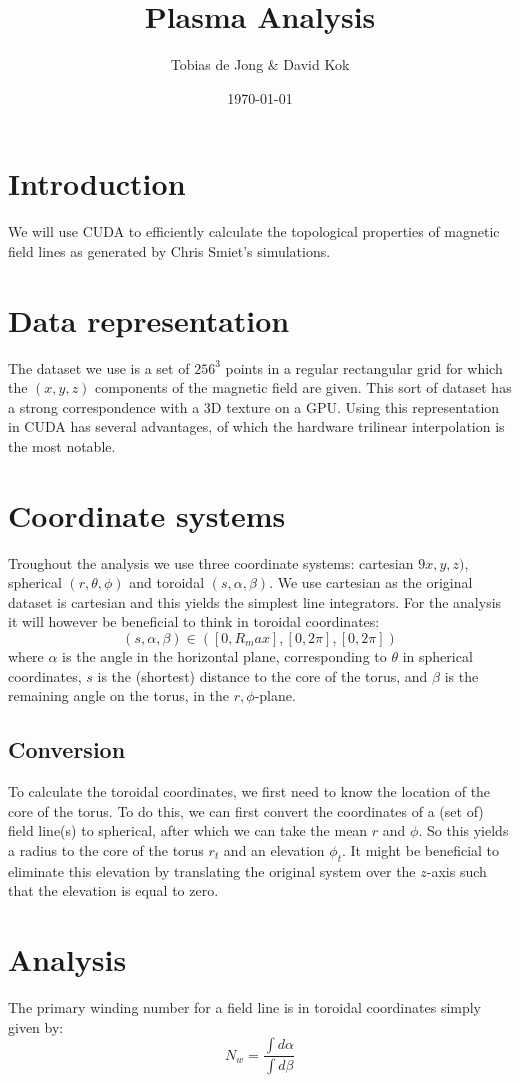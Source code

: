 \documentclass{article}
\begin{document}
\title{Plasma Analysis}
\author{Tobias de Jong \& David Kok}
\date{\today}
\maketitle
\section{Introduction}
We will use CUDA to efficiently calculate the topological properties of magnetic field lines as generated by Chris Smiet's simulations.\cite{PhysRevLett.115.095001}
\section{Data representation}
The dataset we use is a set of $256^3$ points in a regular rectangular grid for which the $(x,y,z)$ components of the magnetic field are given. This sort of dataset has a strong correspondence with a 3D texture on a GPU. Using this representation in CUDA has several advantages, of which the hardware trilinear interpolation is the most notable.
\section{Coordinate systems}
Troughout the analysis we use three coordinate systems: cartesian $9x,y,z)$, spherical $(r,\theta,\phi)$ and toroidal $(s,\alpha, \beta)$. We use cartesian as the original dataset is cartesian and this yields the simplest line integrators. For the analysis it will however be beneficial to think in toroidal coordinates:
\[(s,\alpha,\beta)\in ([0,R_max],[0,2\pi],[0,2\pi])\]
where $\alpha$ is the angle in the horizontal plane, corresponding to $\theta$ in spherical coordinates, $s$ is the (shortest) distance to the core of the torus, and $\beta$ is the remaining angle on the torus, in the $r,\phi$-plane.
\subsection{Conversion}
To calculate the toroidal coordinates, we first need to know the location of the core of the torus. To do this, we can first convert the coordinates of a (set of) field line(s) to spherical, after which we can take the mean $r$ and $\phi$. So this yields a radius to the core of the torus $r_t$ and an elevation $\phi_t$. It might be beneficial to eliminate this elevation by translating the original system over the $z$-axis such that the elevation is equal to zero.
\section{Analysis}
The primary winding number for a field line is in toroidal coordinates simply given by:
\[N_w = \frac{\int d\alpha}{\int d\beta}\]


\end{document}
